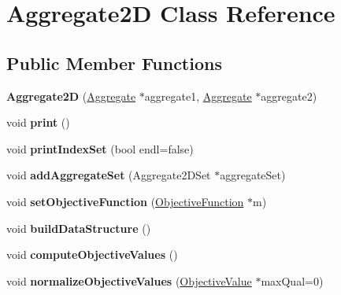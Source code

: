 \hypertarget{classAggregate2D}{\section{Aggregate2\-D Class Reference}
\label{classAggregate2D}
}
\subsection*{Public Member Functions}
\begin{DoxyCompactItemize}
\item 
\hypertarget{classAggregate2D_a2b68f19cfccdff904709b90fb3dff5b4}{{\bfseries Aggregate2\-D} (\hyperlink{classAggregate}{Aggregate} $\ast$aggregate1, \hyperlink{classAggregate}{Aggregate} $\ast$aggregate2)}\label{classAggregate2D_a2b68f19cfccdff904709b90fb3dff5b4}

\item 
\hypertarget{classAggregate2D_a59913da9960c11ee912cbb4c70a44b3c}{void {\bfseries print} ()}\label{classAggregate2D_a59913da9960c11ee912cbb4c70a44b3c}

\item 
\hypertarget{classAggregate2D_ad7964a90c424483b8c53d3b7b9bf9623}{void {\bfseries print\-Index\-Set} (bool endl=false)}\label{classAggregate2D_ad7964a90c424483b8c53d3b7b9bf9623}

\item 
\hypertarget{classAggregate2D_a6a450cda2d0511876ad31329ec167ec4}{void {\bfseries add\-Aggregate\-Set} (Aggregate2\-D\-Set $\ast$aggregate\-Set)}\label{classAggregate2D_a6a450cda2d0511876ad31329ec167ec4}

\item 
\hypertarget{classAggregate2D_a557c87ef09101f761d932c7437dc4d79}{void {\bfseries set\-Objective\-Function} (\hyperlink{classObjectiveFunction}{Objective\-Function} $\ast$m)}\label{classAggregate2D_a557c87ef09101f761d932c7437dc4d79}

\item 
\hypertarget{classAggregate2D_a2fdf5eb5c55467adff69221e42698ac7}{void {\bfseries build\-Data\-Structure} ()}\label{classAggregate2D_a2fdf5eb5c55467adff69221e42698ac7}

\item 
\hypertarget{classAggregate2D_a5b9457435caa76b566b81d881bd97994}{void {\bfseries compute\-Objective\-Values} ()}\label{classAggregate2D_a5b9457435caa76b566b81d881bd97994}

\item 
\hypertarget{classAggregate2D_aed72cdb0b7ede71dd3fc30e0e495b552}{void {\bfseries normalize\-Objective\-Values} (\hyperlink{classObjectiveValue}{Objective\-Value} $\ast$max\-Qual=0)}\label{classAggregate2D_aed72cdb0b7ede71dd3fc30e0e495b552}


\end{DoxyCompactItemize}
